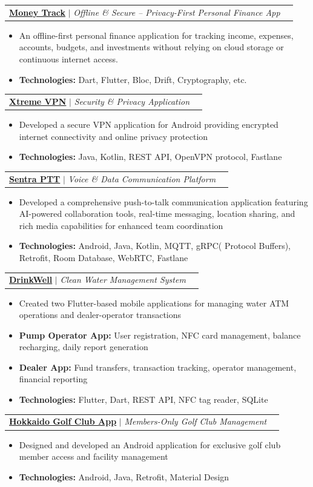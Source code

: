 \documentclass[letterpaper,11pt]{article}
\makeatletter
\newcommand{\resumeItem}[1]{
  \item\small{
    {#1 \vspace{-2pt}}
  }
}
\newcommand{\resumeProjectHeading}[2]{
    \item
    \begin{tabular*}{0.97\textwidth}{l@{\extracolsep{\fill}}r}
      \small#1 & #2 \\
    \end{tabular*}\vspace{-5pt}
}
\newcommand{\resumeItemListStart}{\begin{itemize}}
\newcommand{\resumeItemListEnd}{\end{itemize}\vspace{-5pt}}
\makeatother
\begin{document}
    \resumeProjectHeading
          {\textbf{\href{https://play.google.com/store/apps/details?id=com.github.almasud.money_tracker}{Money Track}} $|$ \emph{Offline \& Secure -- Privacy-First Personal Finance App}}{}
          \resumeItemListStart
            \resumeItem{An offline-first personal finance application for tracking income, expenses, accounts, budgets, and investments without relying on cloud storage or continuous internet access.}
            \resumeItem{\textbf{Technologies:} Dart, Flutter, Bloc, Drift, Cryptography, etc.}
          \resumeItemListEnd

      \resumeProjectHeading
          {\textbf{\href{https://play.google.com/store/apps/details?id=com.github.almasud.xtreme_vpn}{Xtreme VPN}} $|$ \emph{Security \& Privacy Application}}{}
          \resumeItemListStart
            \resumeItem{Developed a secure VPN application for Android providing encrypted internet connectivity and online privacy protection}
            \resumeItem{\textbf{Technologies:} Java, Kotlin, REST API, OpenVPN protocol, Fastlane}
          \resumeItemListEnd

      \resumeProjectHeading
          {\textbf{\href{https://play.google.com/store/apps/details?id=com.nybsys.sentra.sitex}{Sentra PTT}} $|$ \emph{Voice \& Data Communication Platform}}{}
          \resumeItemListStart
            \resumeItem{Developed a comprehensive push-to-talk communication application featuring AI-powered collaboration tools, real-time messaging, location sharing, and rich media capabilities for enhanced team coordination}
            \resumeItem{\textbf{Technologies:} Android, Java, Kotlin, MQTT, gRPC( Protocol Buffers), Retrofit, Room Database, WebRTC, Fastlane}
          \resumeItemListEnd

      \resumeProjectHeading
          {\textbf{\href{https://www.drinkwell.com}{DrinkWell}} $|$ \emph{Clean Water Management System}}{}
          \resumeItemListStart
            \resumeItem{Created two Flutter-based mobile applications for managing water ATM operations and dealer-operator transactions}
            \resumeItem{\textbf{Pump Operator App:} User registration, NFC card management, balance recharging, daily report generation}
            \resumeItem{\textbf{Dealer App:} Fund transfers, transaction tracking, operator management, financial reporting}
            \resumeItem{\textbf{Technologies:} Flutter, Dart, REST API, NFC tag reader, SQLite}
          \resumeItemListEnd

      \resumeProjectHeading
          {\textbf{\href{https://play.google.com/store/apps/details?id=hokkaido.classic.g.c}{Hokkaido Golf Club App}} $|$ \emph{Members-Only Golf Club Management}}{}
          \resumeItemListStart
            \resumeItem{Designed and developed an Android application for exclusive golf club member access and facility management}
            \resumeItem{\textbf{Technologies:} Android, Java, Retrofit, Material Design}
          \resumeItemListEnd
\end{document}
